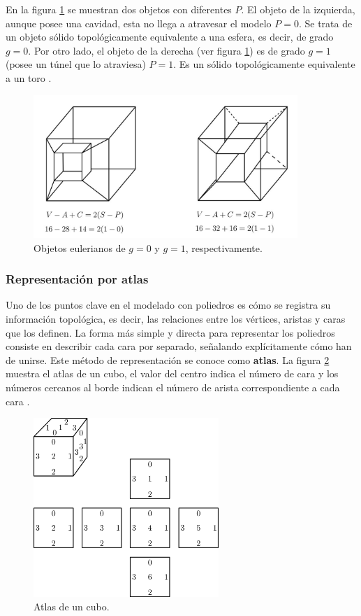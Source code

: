 En la figura \ref{fig:euler2} se muestran dos objetos con diferentes $P$. 
El objeto de la izquierda, aunque posee una cavidad, esta no llega a atravesar el modelo $P=0$. Se trata de un objeto sólido topológicamente equivalente a una esfera, es decir, de grado $g = 0$.\newline
Por otro lado, el objeto de la derecha (ver figura \ref{fig:euler2}) es de grado $g = 1$ (posee un túnel que lo atraviesa) $P=1$. Es un sólido topológicamente equivalente a un toro \cite{Ramos2011}.\newline


\begin{figure}[ht]
\includegraphics[width=10cm]{Img/GEO/geo-euler2.jpg}
\centering
\caption{\footnotesize{Objetos eulerianos de $g= 0$ y $g=1$, respectivamente. }}
\label{fig:euler2}
\end{figure}


\subsubsection{Representación por atlas}
Uno de los puntos clave en el modelado con poliedros es cómo se registra su información topológica, es decir, las relaciones entre los vértices, aristas y caras que los definen.
La forma más simple y directa para representar los poliedros consiste en describir cada cara por separado, señalando explícitamente cómo han de unirse. Este método de representación se conoce como \textbf{atlas}. 
La figura \ref{fig:atlascubo} muestra el atlas de un cubo, el valor del centro indica el número de cara y los números cercanos al borde indican el número de arista correspondiente a cada cara 
\citep{Ramos2011}.

\begin{figure}[h]
\includegraphics[width=7cm]{Img/GEO/geo-atlas0.jpg}
\centering
\caption{\footnotesize{Atlas de un cubo. }}
\label{fig:atlascubo}
\end{figure}

